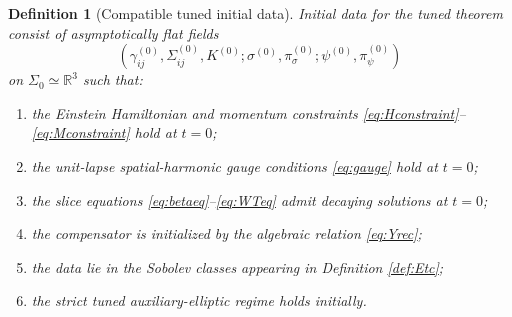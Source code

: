 \documentclass[11pt]{article}
\newtheorem{definition}{Definition}
\begin{document}
\begin{definition}[Compatible tuned initial data]
\label{def:init}
Initial data for the tuned theorem consist of asymptotically flat fields
\begin{equation}
(\gamma_{ij}^{(0)},\Sigma_{ij}^{(0)},K^{(0)};\sigma^{(0)},\pi_\sigma^{(0)};\psi^{(0)},\pi_\psi^{(0)})
\label{eq:initdata}
\end{equation}
on \(\Sigma_0\simeq\mathbb R^3\) such that:
\begin{enumerate}
    \item the Einstein Hamiltonian and momentum constraints \eqref{eq:Hconstraint}--\eqref{eq:Mconstraint} hold at \(t=0\);
    \item the unit-lapse spatial-harmonic gauge conditions \eqref{eq:gauge} hold at \(t=0\);
    \item the slice equations \eqref{eq:betaeq}--\eqref{eq:WTeq} admit decaying solutions at \(t=0\);
    \item the compensator is initialized by the algebraic relation \eqref{eq:Yrec};
    \item the data lie in the Sobolev classes appearing in Definition \ref{def:Etc};
    \item the strict tuned auxiliary-elliptic regime holds initially.
\end{enumerate}
\end{definition}
\end{document}
